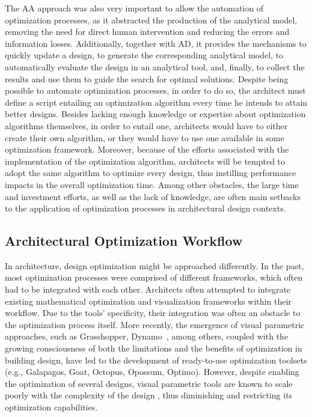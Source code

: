 	The \ac{AA} approach was also very important to allow the automation of optimization processes, as it abstracted the production of the analytical model, removing the need for direct human intervention and reducing the errors and information losses. Additionally, together with \ac{AD}, it provides the mechanisms to quickly update a design, to generate the corresponding analytical model, to automatically evaluate the design in an analytical tool, and, finally, to collect the results and use them to guide the search for optimal solutions. Despite being possible to automate optimization processes, in order to do so, the architect must define a script entailing an optimization algorithm every time he intends to attain better designs. Besides lacking enough knowledge or expertise about optimization algorithms themselves, in order to entail one, architects would have to either create their own algorithm, or they would have to use one available in some optimization framework. Moreover, because of the efforts associated with the implementation of the optimization algorithm, architects will be tempted to adopt the same algorithm to optimize every design, thus instilling performance impacts in the overall optimization time. Among other obstacles, the large time and investment efforts, as well as the lack of knowledge, are often main setbacks to the application of optimization processes in architectural design contexts. 
	
\subsection{Architectural Optimization Workflow}
	
	In architecture, design optimization might be approached differently. In the past, most optimization processes were comprised of different frameworks, which often had to be integrated with each other. Architects often attempted to integrate existing mathematical optimization and visualization frameworks within their workflow. Due to the tools' specificity, their integration was often an obstacle to the optimization process itself. More recently, the emergence of visual parametric approaches, such as Grasshopper, Dynamo~\cite{GRASSHOPPER,DYNAMOBIM}, among others, coupled with the growing consciousness of both the limitations and the benefits of optimization in building design, have led to the development of ready-to-use optimization toolsets (e.g., Galapagos, Goat, Octopus, Opossum, Optimo). However, despite enabling the optimization of several designs, visual parametric tools are known to scale poorly with the complexity of the design , thus diminishing and restricting its optimization capabilities. 
	
